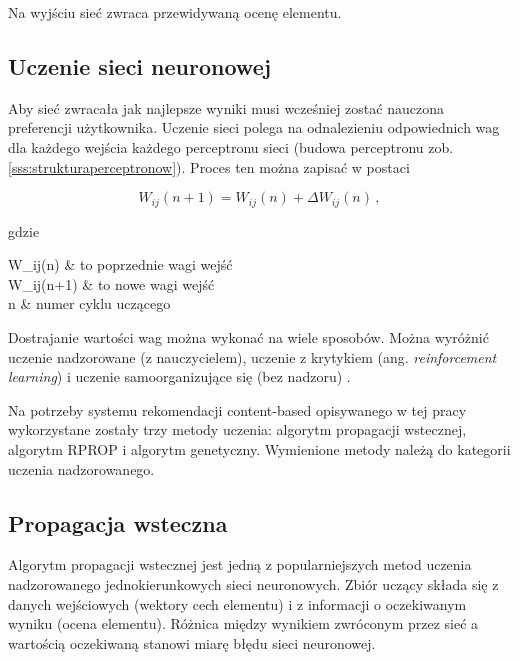 \documentclass[twoside]{iisthesis}
\begin{document}
		 Na wyjściu sieć zwraca przewidywaną ocenę elementu.
		 		 
		 
		 \subsection{Uczenie sieci neuronowej}
		 \label{ss:uczeniesiecineuronowej}
		 
		 Aby sieć zwracała jak najlepsze wyniki musi wcześniej zostać nauczona preferencji użytkownika. Uczenie sieci polega na odnalezieniu odpowiednich wag dla każdego wejścia każdego perceptronu sieci (budowa perceptronu zob. \ref{sss:strukturaperceptronow}). Proces ten można zapisać w postaci
		 
		 \begin{equation}
		 \label{eq:weightadaptation}
		 W_{ij}(n+1) = W_{ij}(n) + \Delta W_{ij}(n) 
		 \,,
		 \end{equation}
		 		 
		 gdzie
		 
		 \begin{conditions*}
		 	W_{ij}(n) & to poprzednie wagi wejść \\
		 	W_{ij}(n+1) & to nowe wagi wejść \\
		 	n & numer cyklu uczącego 
		 \end{conditions*} 
		 
		 Dostrajanie wartości wag można wykonać na wiele sposobów. Można wyróżnić uczenie nadzorowane (z nauczycielem), uczenie z krytykiem (ang. \textit{reinforcement learning}) i uczenie samoorganizujące się (bez nadzoru) \cite{osowski1996sieci}.
		 
		 Na potrzeby systemu rekomendacji content-based opisywanego w tej pracy wykorzystane zostały trzy metody uczenia: algorytm propagacji wstecznej, algorytm RPROP i algorytm genetyczny. Wymienione metody należą do kategorii uczenia nadzorowanego. 
		 
		 
		 \subsection{Propagacja wsteczna}
	 
		 Algorytm propagacji wstecznej jest jedną z popularniejszych metod uczenia nadzorowanego jednokierunkowych sieci neuronowych. Zbiór uczący składa się z danych wejściowych (wektory cech elementu) i z informacji o oczekiwanym wyniku (ocena elementu). Różnica między wynikiem zwróconym przez sieć a wartością oczekiwaną stanowi miarę błędu sieci neuronowej. 
		 
\end{document}
